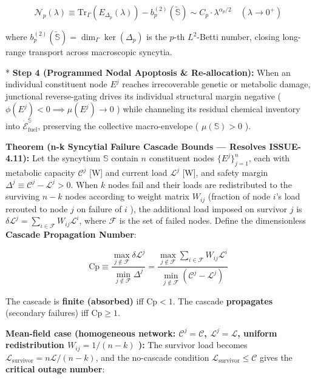 \documentclass[11pt,a4paper]{article}
\theoremstyle{definition}
\theoremstyle{remark}
\begin{document}
\begin{equation}
\boxed{\mathcal{N}_p(\lambda) \equiv \mathrm{Tr}_{\Gamma}\left( E_{\Delta_p}(\lambda) \right) - b_p^{(2)}(\widetilde{\mathbb{S}}) \sim C_p \cdot \lambda^{\alpha_p / 2} \quad (\lambda \to 0^+)}
\end{equation}


where $b_p^{(2)}(\widetilde{\mathbb{S}}) = \dim_\Gamma \ker(\Delta_p)$ is the $p$-th $L^2$-Betti number, closing long-range transport across macroscopic syncytia.

* \textbf{Step 4 (Programmed Nodal Apoptosis \& Re-allocation):}
When an individual constituent node $E^j$ reaches irrecoverable genetic or metabolic damage, junctional reverse-gating drives its individual structural margin negative ( $\phi(E^j) < 0 \implies \mu(E^j) \to 0$ ) while channeling its residual chemical inventory into $\dot{\mathcal{E}}_{\text{fuel}}^{\mathbb{S}}$, preserving the collective macro-envelope ( $\mu(\mathbb{S}) > 0$ ).

\textbf{Theorem (n-k Syncytial Failure Cascade Bounds — Resolves ISSUE-4.11):} Let the syncytium $\mathbb{S}$ contain $n$ constituent nodes $\{E^j\}_{j=1}^n$, each with metabolic capacity $\mathcal{C}^j$ [W] and current load $\mathcal{L}^j$ [W], and safety margin $\Delta^j \equiv \mathcal{C}^j - \mathcal{L}^j > 0$. When $k$ nodes fail and their loads are redistributed to the surviving $n-k$ nodes according to weight matrix $W_{ij}$ (fraction of node $i$'s load rerouted to node $j$ on failure of $i$ ), the additional load imposed on survivor $j$ is $\delta\mathcal{L}^j = \sum_{i \in \mathcal{F}} W_{ij} \mathcal{L}^i$, where $\mathcal{F}$ is the set of failed nodes. Define the dimensionless \textbf{Cascade Propagation Number}:


\begin{equation}
\boxed{\mathrm{Cp} \equiv \frac{\max_{j \notin \mathcal{F}} \delta\mathcal{L}^j}{\min_{j \notin \mathcal{F}} \Delta^j} = \frac{\max_{j \notin \mathcal{F}} \sum_{i \in \mathcal{F}} W_{ij} \mathcal{L}^i}{\min_{j \notin \mathcal{F}} (\mathcal{C}^j - \mathcal{L}^j)}}
\end{equation}


The cascade is \textbf{finite (absorbed)} iff $\mathrm{Cp} < 1$. The cascade \textbf{propagates} (secondary failures) iff $\mathrm{Cp} \geq 1$.

\textbf{Mean-field case (homogeneous network: $\mathcal{C}^j = \mathcal{C}$, $\mathcal{L}^j = \mathcal{L}$, uniform redistribution $W_{ij} = 1/(n-k)$ ):} The survivor load becomes $\mathcal{L}_{\text{survivor}} = n\mathcal{L}/(n-k)$, and the no-cascade condition $\mathcal{L}_{\text{survivor}} \leq \mathcal{C}$ gives the \textbf{critical outage number}:
\end{document}
